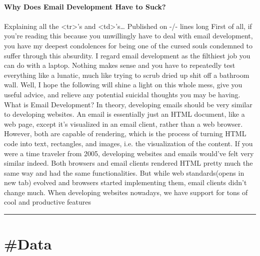 \documentclass[10pt,a4paper]{article}
\begin{document}
\begin{multicols*}{2}
\paragraph{}
\textbf{Why Does Email Development Have to Suck?}
\paragraph{}

Explaining all the <tr>'s and <td>'s…
Published on
-/- lines long
First of all, if you're reading this because you unwillingly have to deal with email development, you have my deepest condolences for being one of the cursed souls condemned to suffer through this absurdity.
I regard email development as the filthiest job you can do with a laptop. Nothing makes sense and you have to repeatedly test everything like a lunatic, much like trying to scrub dried up shit off a bathroom wall.
Well, I hope the following will shine a light on this whole mess, give you useful advice, and relieve any potential suicidal thoughts you may be having.
What is Email Development?
In theory, developing emails should be very similar to developing websites. An email is essentially just an HTML document, like a web page, except it's visualized in an email client, rather than a web browser. However, both are capable of rendering, which is the process of turning HTML code into text, rectangles, and images, i.e. the visualization of the content.
If you were a time traveler from 2005, developing websites and emails would've felt very similar indeed. Both browsers and email clients rendered HTML pretty much the same way and had the same functionalities. But while web standards(opens in new tab) evolved and browsers started implementing them, email clients didn't change much.
When developing websites nowadays, we have support for tons of cool and productive features
\par\noindent\textcolor{red}{\rule{\linewidth}{0.2mm}}
\vfill
\null
\end{multicols*}

\newpage
\section{\#Data}
\end{document}
